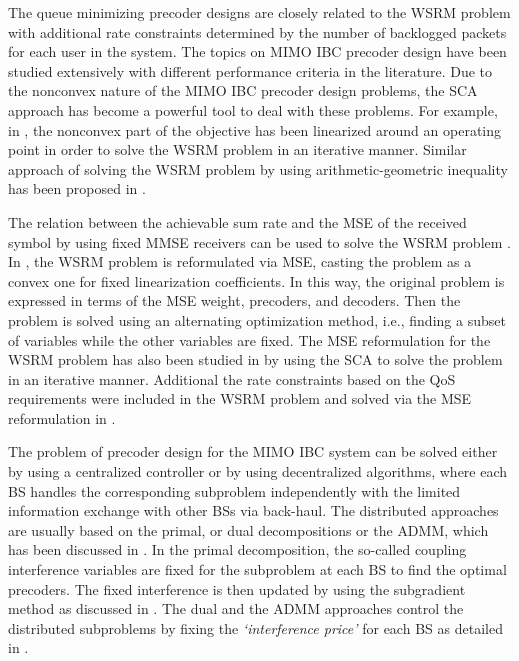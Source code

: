 The queue minimizing precoder designs are closely related to the \ac{WSRM} problem with additional rate constraints determined by the number of backlogged packets for each user in the system. The topics on \ac{MIMO} \ac{IBC} precoder design have been studied extensively with different performance criteria in the literature. Due to the nonconvex nature of the \ac{MIMO} \ac{IBC} precoder design problems, the \ac{SCA} approach has become a powerful tool to deal with these problems. For example, in \cite{sin_algorithm}, the nonconvex part of the objective has been linearized around an operating point in order to solve the \ac{WSRM} problem in an iterative manner. Similar approach of solving the \ac{WSRM} problem by using arithmetic-geometric inequality has been proposed in \cite{tran2012fast}.

The relation between the achievable sum rate and the \ac{MSE} of the received symbol by using fixed \ac{MMSE} receivers can be used to solve the \ac{WSRM} problem \cite{mse_duality}. In \cite{christensen2008weighted,wmmse_shi}, the \ac{WSRM} problem is reformulated via \ac{MSE}, casting the problem as a convex one for fixed linearization coefficients. In this way, the original problem is expressed in terms of the \ac{MSE} weight, precoders, and decoders. Then the problem is solved using an alternating optimization method, i.e., finding a subset of variables while the other variables are fixed. The \ac{MSE} reformulation for the \ac{WSRM} problem has also been studied in \cite{hong2012decomposition} by using the \ac{SCA} to solve the problem in an iterative manner. Additional the rate constraints based on the \ac{QoS} requirements were included in the \ac{WSRM} problem and solved via the \ac{MSE} reformulation in \cite{kaleva2013primal,kaleva2013decentralized}.

The problem of precoder design for the \ac{MIMO} \ac{IBC} system can be solved either by using a centralized controller or by using decentralized algorithms, where each \ac{BS} handles the corresponding subproblem independently with the limited information exchange with other \acp{BS} via back-haul. The distributed approaches are usually based on the primal, or dual decompositions or the \ac{ADMM}, which has been discussed in \cite{palomar2006tutorial,boyd2011distributed}. In the  primal decomposition, the so-called coupling interference variables are fixed for the subproblem at each \ac{BS} to find the optimal precoders. The fixed interference is then updated by using the subgradient method as discussed in \cite{pennanen2011decentralized}. The dual and the \ac{ADMM} approaches control the distributed subproblems by fixing the \emph{`interference price'} for each \ac{BS} as detailed in \cite{tolli2011decentralized}.

